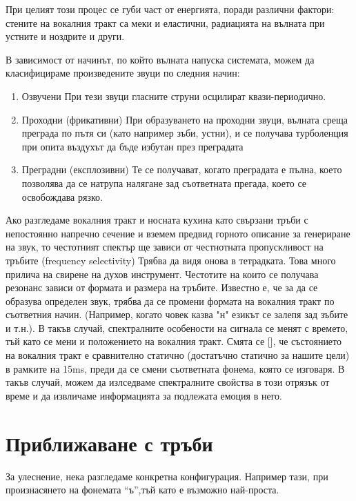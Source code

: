 \documentclass[12pt]{report}
\numberwithin{equation}{section}
\numberwithin{figure}{section}
\begin{document}
    При целият този процес се губи част от енергията, поради различни фактори: стените на вокалния тракт са меки и еластични, радиацията на вълната при устните и ноздрите и други.

    В зависимост от начинът, по който вълната напуска системата, можем да класифицираме произведените звуци по следния начин:

    \begin{enumerate}
        \item Озвучени 
        При тези звуци гласните струни осцилират квази-периодично.
        \item Проходни (фрикативни) 
        При образуването на проходни звуци, вълната среща преграда по пътя си
            (като например зъби, устни), и се получава турболенция при опита въздухът да бъде избутан през преградата
        \item Преградни (експлозивни)
        Те се получават, когато преградата е пълна, което позволява да се натрупа налягане
        зад съответната прегада, което се освобождава рязко.
    \end{enumerate}
    
    Ако разгледаме вокалния тракт и носната кухина като свързани тръби с непостоянно напречно сечение и вземем предвид горното описание за генериране на звук,
    то честотният спектър ще зависи от честнотната пропускливост на тръбите (frequency selectivity) Трябва да видя онова в тетрадката. Това много прилича на свирене на духов инструмент.
    Честотите на които се получава резонанс зависи от формата и размера на тръбите. Известно е, че за да се образува определен звук, трябва да се промени формата на вокалния тракт по 
    съответния начин. (Например, когато човек казва "н" езикът се залепя зад зъбите и т.н.). В такъв случай, спектралните особености на сигнала се менят с времето, тъй като се мени и
    положението на вокалния тракт. Смята се [], че състоянието на вокалния тракт е сравнително статично (достатъчно статично за нашите цели) в рамките на 15ms, преди да се смени съответната
    фонема, която се изговаря. В такъв случай, можем да излседваме спектралните свойства в този отрязък от време и да извличаме информацията за подлежата емоция в него. 

    \section{Приближаване с тръби}
    За улеснение, нека разгледаме конкретна конфигурация. Например тази, при произнасянето на фонемата ``ъ'',тъй като е възможно най-проста.
    
\end{document}
